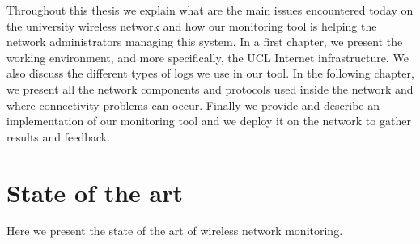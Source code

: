 Throughout this thesis we explain what are the main issues encountered today on the university wireless network and how our monitoring tool is helping the network administrators managing this system. In a first chapter, we present the working environment, and more specifically, the UCL Internet infrastructure. We also discuss the different types of logs we use in our tool. In the following chapter, we present all the network components and protocols used inside the network and where connectivity problems can occur. Finally we provide and describe an implementation of our monitoring tool and we deploy it on the network to gather results and feedback.


\section{State of the art}
Here we present the state of the art of wireless network monitoring.